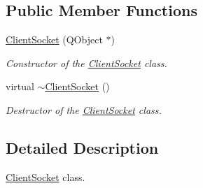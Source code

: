 \subsection*{Public Member Functions}
\begin{DoxyCompactItemize}
\item 
\hyperlink{class_network_1_1_client_socket_a5341c9436384cffa0eb88b7b512cb2bd}{Client\+Socket} (Q\+Object $\ast$)
\begin{DoxyCompactList}\small\item\em Constructor of the \hyperlink{class_network_1_1_client_socket}{Client\+Socket} class. \end{DoxyCompactList}\item 
virtual \hyperlink{class_network_1_1_client_socket_abbfaf3cf060cc314698f8217467ea684}{$\sim$\+Client\+Socket} ()
\begin{DoxyCompactList}\small\item\em Destructor of the \hyperlink{class_network_1_1_client_socket}{Client\+Socket} class. \end{DoxyCompactList}\end{DoxyCompactItemize}


\subsection{Detailed Description}
\hyperlink{class_network_1_1_client_socket}{Client\+Socket} class. 

